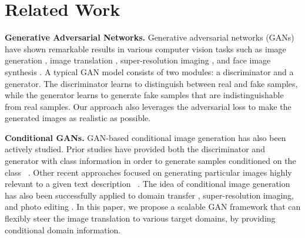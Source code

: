 \documentclass[10pt,twocolumn,letterpaper]{article}
\begin{document}
\section{Related Work} \label{related work}

\noindent\textbf{Generative Adversarial Networks.} Generative adversarial networks (GANs) \cite{goodfellow2014generative} have shown remarkable results in various computer vision tasks such as image generation \cite{Huang_2017_CVPR,radford2015unsupervised,zhao2016energy,karras2017progressive}, image translation \cite{Isola_2017_CVPR,kim2017learning,zhu2017unpaired}, super-resolution imaging \cite{Ledig_2017_CVPR}, and face image synthesis \cite{kim2017unsupervised,li2016deep,Shen_2017_CVPR,Zhang_2017_CVPR}. A typical GAN model consists of two modules: a discriminator and a generator. The discriminator learns to distinguish between real and fake samples, while the generator learns to generate fake samples that are indistinguishable from real samples. Our approach also leverages the adversarial loss to make the generated images as realistic as possible.

\medskip

\noindent\textbf{Conditional GANs.} GAN-based conditional image generation has also been actively studied. Prior studies have provided both the discriminator and generator with class information in order to generate samples conditioned on the class ~\cite{mirza2014conditional,odena2016semi,odena2016conditional}. Other recent approaches focused on generating particular images highly relevant to a given text description ~\cite{reed2016generative,zhang2016stackgan}. The idea of conditional image generation has also been successfully applied to domain transfer \cite{kim2017learning,taigman2016unsupervised}, super-resolution imaging\cite{Ledig_2017_CVPR}, and photo editing \cite{brock2016neural,Shu_2017_CVPR}.
In this paper, we propose a scalable GAN framework that can flexibly steer the image translation to various target domains, by providing conditional domain information. 

\medskip
\end{document}
